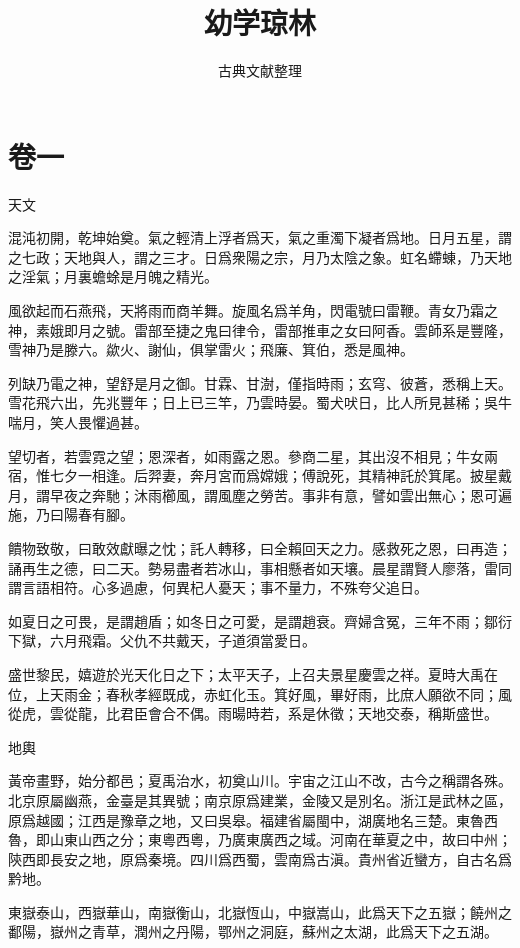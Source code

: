 \documentclass[12pt,a4paper]{ctexbook}
\title{幼学琼林}
\author{古典文献整理}
\date{}
\begin{document}
\maketitle
\tableofcontents
\newpage
\section{卷一}
天文\par
混沌初開，乾坤始奠。氣之輕清上浮者爲天，氣之重濁下凝者爲地。日月五星，謂之七政；天地與人，謂之三才。日爲衆陽之宗，月乃太陰之象。虹名螮蝀，乃天地之淫氣；月裏蟾蜍是月魄之精光。\par
風欲起而石燕飛，天將雨而商羊舞。旋風名爲羊角，閃電號曰雷鞭。青女乃霜之神，素娥即月之號。雷部至捷之鬼曰律令，雷部推車之女曰阿香。雲師系是豐隆，雪神乃是滕六。歘火、謝仙，俱掌雷火；飛廉、箕伯，悉是風神。\par
列缺乃電之神，望舒是月之御。甘霖、甘澍，僅指時雨；玄穹、彼蒼，悉稱上天。雪花飛六出，先兆豐年；日上已三竿，乃雲時晏。蜀犬吠日，比人所見甚稀；吳牛喘月，笑人畏懼過甚。\par
望切者，若雲霓之望；恩深者，如雨露之恩。參商二星，其出沒不相見；牛女兩宿，惟七夕一相逢。后羿妻，奔月宮而爲嫦娥；傅說死，其精神託於箕尾。披星戴月，謂早夜之奔馳；沐雨櫛風，謂風塵之勞苦。事非有意，譬如雲出無心；恩可遍施，乃曰陽春有腳。\par
饋物致敬，曰敢效獻曝之忱；託人轉移，曰全賴回天之力。感救死之恩，曰再造；誦再生之德，曰二天。勢易盡者若冰山，事相懸者如天壤。晨星謂賢人廖落，雷同謂言語相符。心多過慮，何異杞人憂天；事不量力，不殊夸父追日。\par
如夏日之可畏，是謂趙盾；如冬日之可愛，是謂趙衰。齊婦含冤，三年不雨；鄒衍下獄，六月飛霜。父仇不共戴天，子道須當愛日。\par
盛世黎民，嬉遊於光天化日之下；太平天子，上召夫景星慶雲之祥。夏時大禹在位，上天雨金；春秋孝經既成，赤虹化玉。箕好風，畢好雨，比庶人願欲不同；風從虎，雲從龍，比君臣會合不偶。雨暘時若，系是休徵；天地交泰，稱斯盛世。\par
地輿\par
黃帝畫野，始分都邑；夏禹治水，初奠山川。宇宙之江山不改，古今之稱謂各殊。北京原屬幽燕，金臺是其異號；南京原爲建業，金陵又是別名。浙江是武林之區，原爲越國；江西是豫章之地，又曰吳皋。福建省屬閩中，湖廣地名三楚。東魯西魯，即山東山西之分；東粵西粵，乃廣東廣西之域。河南在華夏之中，故曰中州；陝西即長安之地，原爲秦境。四川爲西蜀，雲南爲古滇。貴州省近蠻方，自古名爲黔地。\par
東嶽泰山，西嶽華山，南嶽衡山，北嶽恆山，中嶽嵩山，此爲天下之五嶽；饒州之鄱陽，嶽州之青草，潤州之丹陽，鄂州之洞庭，蘇州之太湖，此爲天下之五湖。\par
\end{document}
